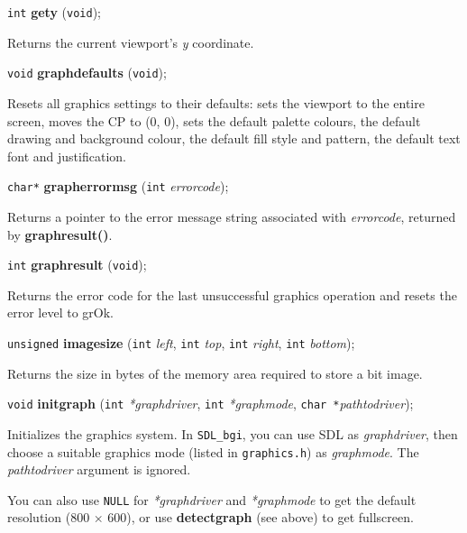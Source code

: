 \documentclass[a4paper,11pt]{article}
\newcommand{\SDLbgi}{\texttt{SDL\_bgi}}
\newcommand{\V}{\texttt{void}}      %
\newcommand{\I}{\texttt{int}}       %
\newcommand{\C}{\texttt{char *}}    %
\newcommand{\func}[1]{\textbf{#1}}  %
\newcommand{\A}[1]{\emph{#1}}       %
\newcommand{\F}[1]{\texttt{#1}}     %
\newcommand{\T}[1]{\texttt{#1}}     %
\newenvironment{bgi}
{ %
  \begin{snugshade}
}
{ %
  \end{snugshade}
}
\begin{document}
\begin{bgi}
\I{} \func{gety} (\V{});
\end{bgi}

Returns the current viewport's \A{y} coordinate.


\begin{bgi}
\V{} \func{graphdefaults} (\V{});
\end{bgi}

Resets all graphics settings to their defaults: sets the viewport to
the entire screen, moves the CP to (0, 0), sets the default palette
colours, the default drawing and background colour, the default fill
style and pattern, the default text font and justification.


\begin{bgi}
\texttt{char*} \func{grapherrormsg} (\I{} \A{errorcode});
\end{bgi}

Returns a pointer to the error message string associated with
\A{errorcode}, returned by \func{graphresult()}.


\begin{bgi}
\I{} \func{graphresult} (\V{});
\end{bgi}

Returns the error code for the last unsuccessful graphics operation
and resets the error level to grOk.


\begin{bgi}
\texttt{unsigned} \func{imagesize} (\I{} \A{left}, \I{} \A{top}, \I{}
\A{right}, \I{} \A{bottom});
\end{bgi}

Returns the size in bytes of the memory area required to store a bit
image.


\begin{bgi}
\V{} \func{initgraph} (\I{} \A{*graphdriver}, \I{} \A{*graphmode},
\C{}\A{pathtodriver});
\end{bgi}

Initializes the graphics system. In \SDLbgi, you can use SDL as
\A{graphdriver}, then choose a suitable graphics mode (listed in
\F{graphics.h}) as \A{graphmode}. The \A{pathtodriver} argument is
ignored.

You can also use \T{NULL} for \A{*graphdriver} and \A{*graphmode} to
get the default resolution (800 $\times$ 600), or use
\func{detectgraph} (see above) to get fullscreen.
\end{document}
